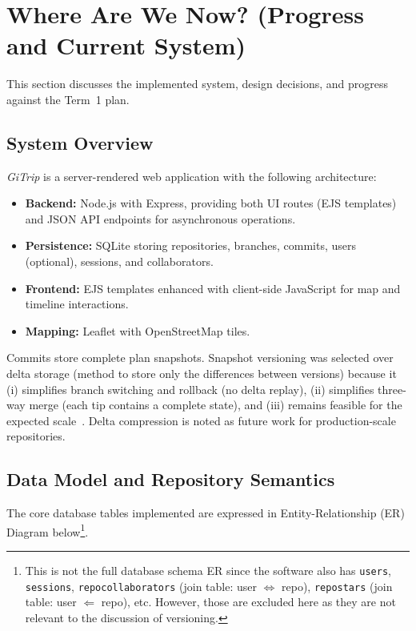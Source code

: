 \section{Where Are We Now? (Progress and Current System)}
\label{sec:current}

This section discusses the implemented system, design decisions, and progress against the Term~1 plan.

\subsection{System Overview}
\textit{GiTrip} is a server-rendered web application with the following architecture:
\begin{itemize}
  \item \textbf{Backend:} Node.js with Express, providing both UI routes (EJS templates) and JSON API endpoints for asynchronous operations.
  \item \textbf{Persistence:} SQLite storing repositories, branches, commits, users (optional), sessions, and collaborators.
  \item \textbf{Frontend:} EJS templates enhanced with client-side JavaScript for map and timeline interactions.
  \item \textbf{Mapping:} Leaflet with OpenStreetMap tiles.
\end{itemize}

Commits store complete plan snapshots. Snapshot versioning was selected over delta storage (method to store only the differences between versions) because it (i) simplifies branch switching and rollback (no delta replay), (ii) simplifies three-way merge (each tip contains a complete state), and (iii) remains feasible for the expected scale~\cite{progit-snapshots}. Delta compression is noted as future work for production-scale repositories.

\subsection{Data Model and Repository Semantics}
The core database tables implemented are expressed in Entity-Relationship (ER) Diagram below\footnote{This is not the full database schema ER since the software also has \texttt{users}, \texttt{sessions}, \texttt{repo\textunderscore collaborators} (join table: user $\Leftrightarrow$ repo), \texttt{repo\textunderscore stars} (join table: user $\Leftarrow$ repo), etc. However, those are excluded here as they are not relevant to the discussion of versioning.}.


